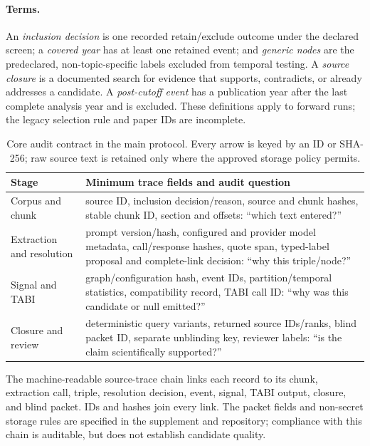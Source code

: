 \documentclass[runningheads]{llncs}
\begin{document}
\paragraph{Terms.} An \emph{inclusion decision} is one recorded retain/exclude outcome under the declared screen; a \emph{covered year} has at least one retained event; and \emph{generic nodes} are the predeclared, non-topic-specific labels excluded from temporal testing. A \emph{source closure} is a documented search for evidence that supports, contradicts, or already addresses a candidate. A \emph{post-cutoff event} has a publication year after the last complete analysis year and is excluded. These definitions apply to forward runs; the legacy selection rule and paper IDs are incomplete.

\begin{table}[t]
\caption{Core audit contract in the main protocol. Every arrow is keyed by an ID or SHA-256; raw source text is retained only where the approved storage policy permits.}
\label{tab:audit-contract}
\centering\scriptsize
\begin{tabular}{p{1.7cm}p{4.7cm}}
\toprule
Stage & Minimum trace fields and audit question\\
\midrule
Corpus and chunk & source ID, inclusion decision/reason, source and chunk hashes, stable chunk ID, section and offsets: ``which text entered?''\\
Extraction and resolution & prompt version/hash, configured and provider model metadata, call/response hashes, quote span, typed-label proposal and complete-link decision: ``why this triple/node?''\\
Signal and TABI & graph/configuration hash, event IDs, partition/temporal statistics, compatibility record, TABI call ID: ``why was this candidate or null emitted?''\\
Closure and review & deterministic query variants, returned source IDs/ranks, blind packet ID, separate unblinding key, reviewer labels: ``is the claim scientifically supported?''\\
\bottomrule
\end{tabular}
\end{table}

The machine-readable source-trace chain links each record to its chunk, extraction call, triple, resolution decision, event, signal, TABI output, closure, and blind packet. IDs and hashes join every link. The packet fields and non-secret storage rules are specified in the supplement and repository; compliance with this chain is auditable, but does not establish candidate quality.
\end{document}
